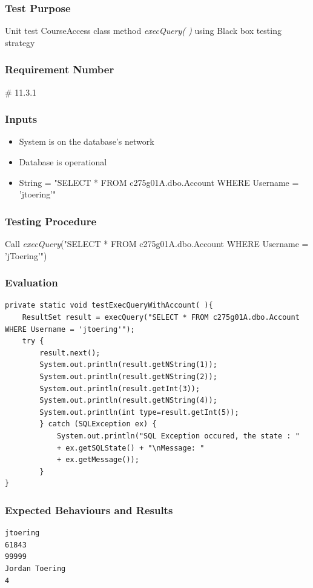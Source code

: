 \documentclass{article}
\begin{document}
\subsubsection{Test Purpose}
Unit test CourseAccess class method \textit{execQuery( )} using Black box testing strategy

\subsubsection{Requirement Number}
\# 11.3.1


\subsubsection{Inputs}
\begin{itemize}
\item System is on the database's network
\item Database is operational
\item String = "SELECT * FROM c275g01A.dbo.Account WHERE Username = 'jtoering'"
\end{itemize}

\subsubsection{Testing Procedure}
Call \textit{execQuery}("SELECT * FROM c275g01A.dbo.Account WHERE Username = 'jToering'")

\subsubsection{Evaluation}
\begin{verbatim}
private static void testExecQueryWithAccount( ){
	ResultSet result = execQuery("SELECT * FROM c275g01A.dbo.Account WHERE Username = 'jtoering'");
	try {
    	result.next();
	    System.out.println(result.getNString(1));
    	System.out.println(result.getNString(2));
	    System.out.println(result.getInt(3));
	    System.out.println(result.getNString(4));
	    System.out.println(int type=result.getInt(5));
	    } catch (SQLException ex) {
  	        System.out.println("SQL Exception occured, the state : "
	   	    + ex.getSQLState() + "\nMessage: "
	   	    + ex.getMessage());
        }
}
\end{verbatim}

\subsubsection{Expected Behaviours and Results}
\begin{verbatim}
jtoering
61843
99999
Jordan Toering
4
\end{verbatim}
\end{document}
